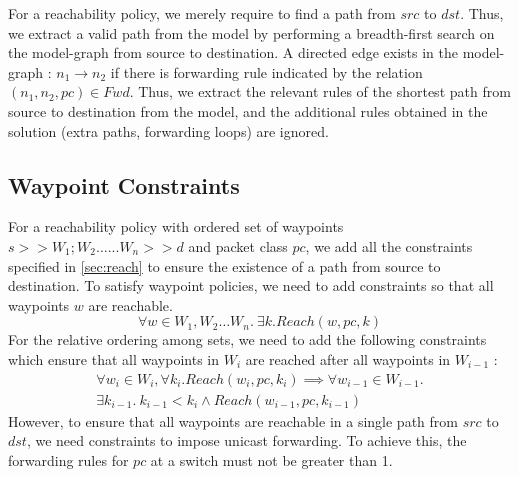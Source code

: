For a reachability policy, we merely require to find a path from $src$ to $dst$. Thus, we extract a valid path from the model by performing a breadth-first search on the model-graph from source to destination. 
A directed edge exists in the model-graph : $n_1 \rightarrow n_2$ if there is forwarding rule indicated by the relation $(n_1,n_2, pc) \in Fwd$. Thus, we extract the relevant rules of the shortest path from source to destination from the model, and the additional rules obtained in the solution (extra paths, forwarding loops) are ignored.  
\subsection{Waypoint Constraints} 
For a reachability policy with ordered set of waypoints $s >> W_1;W_2 \ldots ... W_n >> d$ and packet class $pc$, we add all the constraints specified in \cref{sec:reach} to ensure the existence of a path from source to destination. To satisfy waypoint policies, we need to add constraints so that all waypoints $w$
are reachable. 
\begin{equation} \label{eq:waypoints}
	\forall w \in W_1, W_2 \ldots W_n. \ \exists k. Reach(w, pc, k)
\end{equation}
For the relative ordering among sets, we need to add the following constraints which ensure that all waypoints
in $W_i$ are reached after all waypoints in $W_{i - 1}$ : 
\begin{multline}
\forall w_{i} \in W_{i}, \forall k_i. Reach(w_i, pc, k_i) \implies 
\forall w_{i - 1} \in W_{i-1}. \\ \exists k_{i-1}. \ 
 k_{i-1} < k_{i} \wedge Reach(w_{i-1}, pc, k_{i-1}) 
\end{multline}
However, to ensure that all waypoints are reachable in a single path from
$src$ to $dst$, we need constraints to impose unicast forwarding. To achieve
this, the forwarding rules for $pc$ at a switch must not be greater than 1. 
